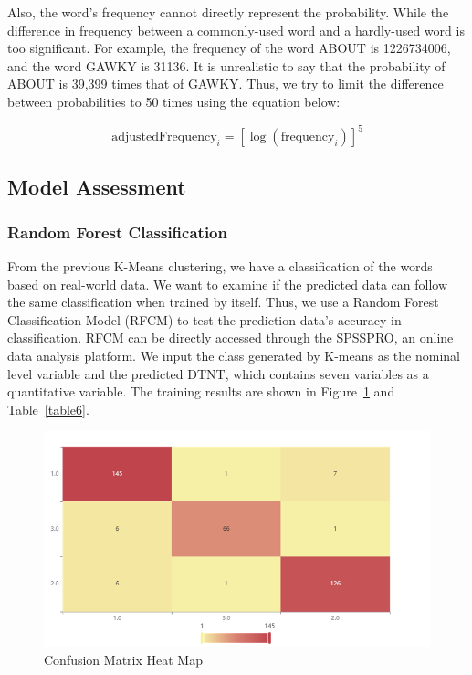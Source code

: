 \documentclass[12pt]{article}
\begin{document}
\vspace{0.3cm}
\noindent
Also, the word’s frequency cannot directly represent the probability. While the difference in frequency between a commonly-used word and a hardly-used word is too significant. For example, the frequency of the word ABOUT is 1226734006, and the word GAWKY is 31136. It is unrealistic to say that the probability of ABOUT is 39,399 times that of GAWKY. Thus, we try to limit the difference between probabilities to 50 times using the equation below: 

$$
\text{adjustedFrequency}_i=[\log(\text{frequency}_i)]^5
$$

\subsection{Model Assessment}

\subsubsection{Random Forest Classification}
From the previous K-Means clustering, we have a classification of the words based on real-world data. We want to examine if the predicted data can follow the same classification when trained by itself. Thus, we use a Random Forest Classification Model (RFCM) to test the prediction data’s accuracy in classification. RFCM can be directly accessed through the SPSSPRO\cite{spsspro}, an online data analysis platform. We input the class generated by K-means as the nominal level variable and the predicted DTNT, which contains seven variables as a quantitative variable. The training results are shown in Figure~\ref{heatMap} and Table~\ref{table6}.

\begin{figure}[h]
    \centering
    \includegraphics[width=13cm]{figures/heatMap.png}
    \caption{Confusion Matrix Heat Map}
    \label{heatMap}
\end{figure}
\end{document}
